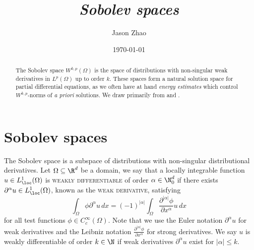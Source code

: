\documentclass[reqno]{amsart}
\title
{
	\emph{Sobolev spaces}
}
\author{Jason Zhao}
\date{\today}
\theoremstyle{definition}
\theoremstyle{remark}
\renewcommand{\emph}{\textsc}
\begin{document}
\maketitle

\begin{abstract}
	The Sobolev space $W^{k, p} (\Omega)$ is the space of distributions with non-singular weak derivatives in $L^p (\Omega)$ up to order $k$. These spaces form a natural solution space for partial differential equations, as we often have at hand \textit{energy estimates} which control $W^{k, p}$-norms of \textit{a priori} solutions. We draw primarily from \cite{Evans2022} and \cite{Oh222}.
\end{abstract}

\tableofcontents
	

\section{Sobolev spaces}

The Sobolev space is a subspace of distributions with non-singular distributional derivatives. Let $\Omega \subseteq \R^d$ be a domain, we say that a locally integrable function $u \in L^1_\loc (\Omega)$ is \emph{weakly differentiable} of order $\alpha \in \N_0^d$ if there exists $\partial^\alpha u \in L^1_\loc (\Omega)$, known as the \emph{weak derivative}, satisfying
	\[ \int_\Omega \phi \partial^\alpha u \, dx = (-1)^{|\alpha|}\int_\Omega \frac{\partial^{|\alpha|} \phi}{\partial x^\alpha} u \, dx  \]
for all test functions $\phi \in C^\infty_c (\Omega)$. Note that we use the Euler notation $\partial^\alpha u$ for weak derivatives and the Leibniz notation $\tfrac{\partial^{|\alpha|}\phi}{\partial x^\alpha}$ for strong derivatives. We say $u$ is weakly differentiable of order $k \in \N$ if weak derivatives $\partial^\alpha u$ exist for $|\alpha| \leq k$. 
\end{document}
